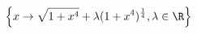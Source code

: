 \begin{displaymath}
 \left\lbrace 
x\rightarrow \sqrt{1+x^4} + \lambda (1+x^4)^{\frac{1}{4}}, \lambda \in \R
\right\rbrace 
\end{displaymath}
